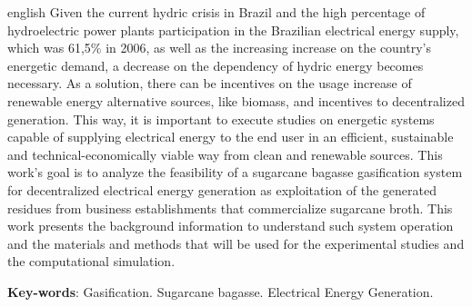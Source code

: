 \begin{resumo}[Abstract]
 \begin{otherlanguage*}{english}
Given the current hydric crisis in Brazil and the high percentage of hydroelectric power plants participation in the Brazilian electrical energy supply, which was 61,5\% in 2006, as well as the increasing increase on the country’s energetic demand, a decrease on the dependency of hydric energy becomes necessary. As a solution, there can be incentives on the usage increase of renewable energy alternative sources, like biomass, and incentives to decentralized generation. This way, it is important to execute studies on energetic systems capable of supplying electrical energy to the end user in an efficient, sustainable and technical-economically viable way from clean and renewable sources. This work’s goal is to analyze the feasibility of a sugarcane bagasse gasification system for decentralized electrical energy generation as exploitation of the generated residues from business establishments that commercialize sugarcane broth. This work presents the background information to understand such system operation and the materials and methods that will be used for the experimental studies and the computational simulation.

   \vspace{\onelineskip}
 
   \noindent 
   \textbf{Key-words}: Gasification. Sugarcane bagasse. Electrical Energy Generation.
 \end{otherlanguage*}
\end{resumo}
